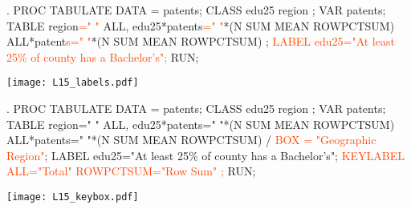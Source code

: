 \begin{frame}[fragile]
\begin{code}{.}
PROC TABULATE DATA = patents;
   CLASS edu25 region ;
   VAR patents;
   TABLE region\textcolor{OrangeRed}{=" "}  ALL,
     edu25*patents\textcolor{OrangeRed}{=" "}*(N SUM MEAN ROWPCTSUM)
     ALL*patent\textcolor{OrangeRed}{s=" "}*(N SUM MEAN ROWPCTSUM) ;
   \textcolor{OrangeRed}{LABEL edu25="At least 25\% of county has a Bachelor's";}
RUN;
\end{code}
\emp
\vskip10pt
\texttt{[image: L15\_labels.pdf]}\\
\end{frame}

\begin{frame}[fragile]
\begin{code}{.}
PROC TABULATE DATA = patents;
   CLASS edu25 region ;
   VAR patents;
   TABLE region=" "  ALL,
         edu25*patents=" "*(N SUM MEAN ROWPCTSUM)
         ALL*patents=" "*(N SUM MEAN ROWPCTSUM) /
         \textcolor{OrangeRed}{BOX = "Geographic Region"};
   LABEL edu25="At least 25\% of county has a Bachelor's";
   \textcolor{OrangeRed}{KEYLABEL ALL="Total" ROWPCTSUM="Row Sum" ;}
RUN;
\end{code}
\emp
\vskip10pt
\texttt{[image: L15\_keybox.pdf]}\\

\end{frame}

